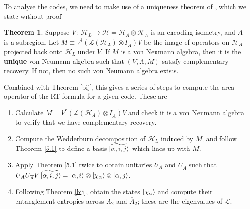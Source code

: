 \documentclass[12pt,a4paper]{report}
\numberwithin{equation}{section}
\newcommand{\ol}[1]{\overline{#1}}
\theoremstyle{definition}
\theoremstyle{theorem}
\newtheorem{theorem}{Theorem}[section]
\theoremstyle{theorem}
\theoremstyle{example}
\theoremstyle{definition}
\begin{document}
To analyse the codes, we need to make use of a uniqueness theorem of \cite{Pollack}, which we state without proof. 
\begin{theorem}
	Suppose $V\,:\,\mathcal{H}_{L}\to\mathcal{H}=\mathcal{H}_{A}\otimes\mathcal{H}_{\ol{A}}$ is an encoding isometry, and $A$ is a subregion. Let $M\equiv V^{\dagger}(\mathcal{L}(\mathcal{H}_{A})\otimes I_{\ol{A}})V$ be the image of operators on $\mathcal{H}_{A}$ projected back onto $\mathcal{H}_{L}$ under $V$. If $M$ is a von Neumann algebra, then it is the \textbf{unique} von Neumann algebra such that $(V,A,M)$ satisfy complementary recovery. If not, then no such von Neumann algebra exists.
\end{theorem}
Combined with Theorem \ref{bij}, this gives a series of steps to compute the area operator of the RT formula for a given code. These are
\begin{enumerate}
	\item Calculate $M=V^{\dagger}(\mathcal{L}(\mathcal{H}_{A})\otimes I_{\ol{A}})V$ and check it is a von Neumann algebra to verify that we have complementary recovery.
	\item Compute the Wedderburn decomposition of $\mathcal{H}_{L}$ induced by $M$, and follow Theorem \ref{5.1} to define a basis $\ket{\widetilde{\alpha,i,j}}$ which lines up with $M$.
	\item Apply Theorem \ref{5.1} twice to obtain unitaries $U_{A}$ and $U_{\ol{A}}$ such that $U_{A}U_{\ol{A}}V\ket{\widetilde{\alpha,i,j}}=\ket{\alpha,i}\otimes\ket{\chi_{\alpha}}\otimes\ket{\alpha,j}$.
	\item Following Theorem \ref{bij}, obtain the states $\ket{\chi_{\alpha}}$ and compute their entanglement entropies across $A_{2}$ and $\ol{A}_{2}$; these are the eigenvalues of $\mathcal{L}$.
\end{enumerate}
\end{document}
